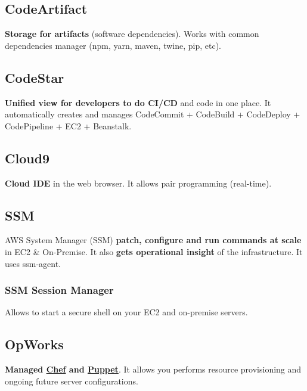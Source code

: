 \subsection{CodeArtifact}\label{subsec:codeartifact}
\textbf{Storage for artifacts} (software dependencies)\@.
Works with common dependencies manager (npm, yarn, maven, twine, pip, etc)\@.

\subsection{CodeStar}\label{subsec:codestar}
\textbf{Unified view for developers to do CI/CD} and code in one place.
It automatically creates and manages CodeCommit + CodeBuild + CodeDeploy + CodePipeline + EC2 + Beanstalk.

\subsection{Cloud9}\label{subsec:cloud9}
\textbf{Cloud IDE} in the web browser.
It allows pair programming (real-time).

\subsection{SSM}\label{subsec:ssm}
AWS System Manager (SSM) \textbf{patch, configure and run commands at scale} in EC2 \& On-Premise.
It also \textbf{gets operational insight} of the infrastructure.
It uses ssm-agent.

\subsubsection{SSM Session Manager}
Allows to start a secure shell on your EC2 and on-premise servers.

\subsection{OpWorks}\label{subsec:opworks}
\textbf{Managed \href{https://www.chef.io/}{Chef} and \href{https://www.puppet.com/}{Puppet}}.
It allows you performs resource provisioning and ongoing future server configurations.
